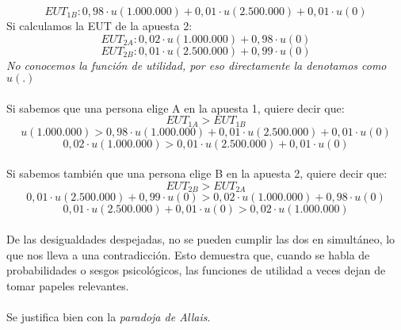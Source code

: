 \documentclass{article}
\begin{document}
        \[EUT_{1B}:0,98 \cdot u(1.000.000) + 0,01 \cdot u(2.500.000) + 0,01 \cdot u(0)\]
        Si calculamos la EUT de la apuesta 2:
        \[EUT_{2A}: 0,02 \cdot u(1.000.000) + 0,98 \cdot u(0)\]
        \[EUT_{2B}: 0,01 \cdot u(2.500.000) + 0,99 \cdot u(0)\]
        \textit{No conocemos la función de utilidad, por eso directamente la denotamos como $u(.)$}
        \\
        \\
        Si sabemos que una persona elige A en la apuesta 1, quiere decir que:
        \[EUT_{1A} > EUT_{1B}\]
        \[u(1.000.000) > 0,98 \cdot u(1.000.000) + 0,01 \cdot u(2.500.000) + 0,01 \cdot u(0)\]
        \[0,02 \cdot u(1.000.000) > 0,01 \cdot u(2.500.000) + 0,01 \cdot u(0)\]
        \\
        Si sabemos también que una persona elige B en la apuesta 2, quiere decir que:
        \[EUT_{2B} > EUT_{2A}\]
        \[0,01 \cdot u(2.500.000) + 0,99 \cdot u(0) > 0,02 \cdot u(1.000.000) + 0,98 \cdot u(0)\]
        \[0,01 \cdot u(2.500.000) + 0,01 \cdot u(0) > 0,02 \cdot u(1.000.000)\]
        \\
        De las desigualdades despejadas, no se pueden cumplir las dos en simultáneo, lo que nos lleva a una contradicción. Esto demuestra que, cuando se habla de probabilidades o sesgos psicológicos, las funciones de utilidad a veces dejan de tomar papeles relevantes.
        \\
        \\
        Se justifica bien con la \emph{paradoja de Allais}.
\end{document}
